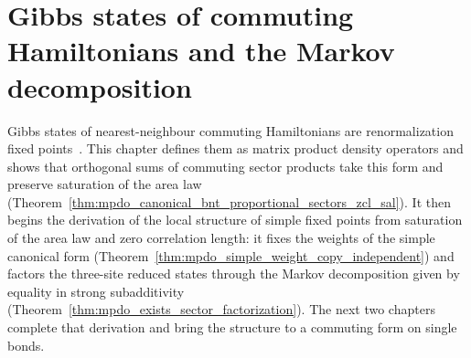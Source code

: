 \chapter{Gibbs states of commuting Hamiltonians and the Markov decomposition}
\label{ch:mpdo_rfp_gibbs}

Gibbs states of nearest-neighbour commuting Hamiltonians are renormalization
fixed points~\cite{Cirac2016MPDO_arXiv}. This chapter defines them as matrix
product density operators and shows that orthogonal sums of commuting sector
products take this form and preserve saturation of the area law
(Theorem~\ref{thm:mpdo_canonical_bnt_proportional_sectors_zcl_sal}). It then
begins the derivation of the local structure of simple fixed points from
saturation of the area law and zero correlation length: it fixes the weights
of the simple canonical form
(Theorem~\ref{thm:mpdo_simple_weight_copy_independent}) and factors the
three-site reduced states through the Markov decomposition given by equality
in strong subadditivity
(Theorem~\ref{thm:mpdo_exists_sector_factorization}). The next
two chapters complete that derivation and bring the structure to a commuting
form on single bonds.



